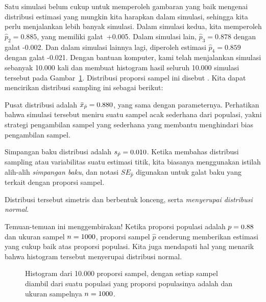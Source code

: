 Satu simulasi belum cukup untuk memperoleh gambaran yang baik mengenai
distribusi estimasi yang mungkin kita harapkan dalam simulasi,
sehingga kita perlu menjalankan lebih banyak simulasi.
Dalam simulasi kedua,
kita memperoleh $\hat{p}_2 = 0.885$, yang memiliki galat~+0.005.
Dalam simulasi lain, $\hat{p}_3 = 0.878$ dengan galat -0.002.
Dan dalam simulasi lainnya lagi,
diperoleh estimasi $\hat{p}_4 = 0.859$ dengan galat -0.021.
Dengan bantuan komputer, kami telah menjalankan simulasi sebanyak 10.000 kali
dan membuat histogram hasil seluruh 10.000 simulasi tersebut
pada Gambar~\ref{sampling_10k_prop_88p}. Distribusi
proporsi sampel ini disebut
.
Kita dapat mencirikan distribusi sampling ini sebagai berikut:
\begin{description}
\setlength{\itemsep}{0mm}
\item[Pusat.]
    Pusat distribusi adalah
    $\bar{x}_{\hat{p}} = 0.88{}0$,
    yang sama dengan parameternya.
    Perhatikan bahwa simulasi tersebut meniru suatu sampel acak sederhana
    dari populasi, yakni strategi pengambilan sampel yang sederhana
    yang membantu menghindari bias pengambilan sampel.
\item[Sebaran.]
    Simpangan baku distribusi
    adalah $s_{\hat{p}} = 0.010{}$.
    Ketika membahas
    distribusi sampling atau variabilitas
    suatu estimasi titik, kita biasanya menggunakan istilah
    alih-alih \emph{simpangan baku},
    dan notasi $SE_{\hat{p}}$ digunakan untuk galat baku
    yang terkait dengan proporsi sampel.
\item[Bentuk.]
    Distribusi tersebut simetris dan berbentuk lonceng,
    serta \emph{menyerupai distribusi normal}.
\end{description}
Temuan-temuan ini menggembirakan!
Ketika proporsi
populasi adalah $p = 0.88{}$ dan ukuran sampel
$n = 1000{}$,
proporsi sampel $\hat{p}$ cenderung memberikan
estimasi yang cukup baik
atas proporsi populasi.
Kita juga mendapati hal yang menarik
bahwa histogram tersebut menyerupai distribusi normal.

\begin{figure}[h]
   \centering
   \caption{Histogram dari 10.000 proporsi sampel,
       dengan setiap sampel diambil dari suatu populasi
       yang proporsi populasinya adalah
       \pewsolarparprop{} dan ukuran sampelnya
       $n = 1000{}$.}
   \label{sampling_10k_prop_88p}
\end{figure}

